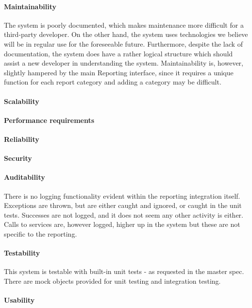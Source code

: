 \documentclass{article}
\begin{document}
            \paragraph{Maintainability}
            The system is poorly documented, which makes maintenance more difficult for a third-party developer. On the other hand, the system uses technologies we believe will be in regular use for the foreseeable future. Furthermore, despite the lack of documentation, the system does have a rather logical structure which should assist a new developer in understanding the system. Maintainability is, however, slightly hampered by the main Reporting interface, since it requires a unique function for each report category and adding a category may be difficult.
            \paragraph{Scalability}
            \paragraph{Performance requirements}
            \paragraph{Reliability}
            \paragraph{Security}
            \paragraph{Auditability}
            There is no logging functionality evident within the reporting integration itself. Exceptions are thrown, but are either caught and ignored, or caught in the unit tests. Successes are not logged, and it does not seem any other activity is either. Calls to services are, however logged, higher up in the system but these are not specific to the reporting.
            \paragraph{Testability}
            This system is testable with built-in unit tests - as requested in the master spec. There are mock objects provided for unit testing and integration testing.
            \paragraph{Usability}
\end{document}
